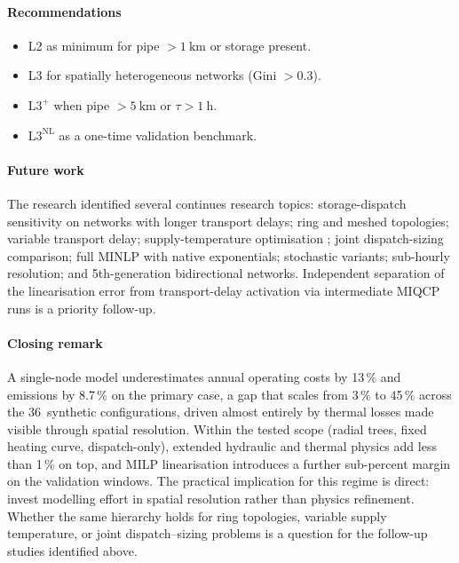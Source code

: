 \documentclass[a4paper,fleqn]{cas-dc}
\newcommand{\Lplus}{\mathrm{L3}^{+}}
\newcommand{\Lnl}{\mathrm{L3}^{\mathrm{NL}}}
\begin{document}
\paragraph{Recommendations}
\begin{itemize}[nosep]
  \item L2 as minimum for pipe ${>}\SI{1}{\kilo\metre}$ or
        storage present.
  \item L3 for spatially heterogeneous networks (Gini ${>}0.3$).
  \item $\Lplus$ when pipe ${>}\SI{5}{\kilo\metre}$ or
        $\tau > \SI{1}{\hour}$.
  \item $\Lnl$ as a one-time validation benchmark.
\end{itemize}

\paragraph{Future work}
The research identified several continues research topics: storage-dispatch sensitivity on networks with longer transport delays; ring and meshed topologies; variable transport delay; supply-temperature optimisation ; joint dispatch-sizing comparison; full MINLP with native exponentials; stochastic variants; sub-hourly resolution; and 5th-generation bidirectional networks. Independent separation of the linearisation error from transport-delay activation via intermediate MIQCP runs is a
priority follow-up.

\paragraph{Closing remark}
A single-node model underestimates annual operating costs by
13\,\% and  emissions by 8.7\,\% on the primary
case, a gap that scales from 3\,\% to 45\,\% across the
36~synthetic configurations, driven almost entirely by thermal losses made
visible through spatial resolution. Within the tested scope
(radial trees, fixed heating curve, dispatch-only), extended
hydraulic and thermal physics add less than 1\,\% on top, and
MILP linearisation introduces a further sub-percent margin on the
validation windows. The practical implication for this regime is
direct: invest modelling effort in spatial resolution rather than
physics refinement. Whether the same hierarchy holds for ring
topologies, variable supply temperature, or joint
dispatch--sizing problems is a question for the follow-up
studies identified above.

\end{document}
